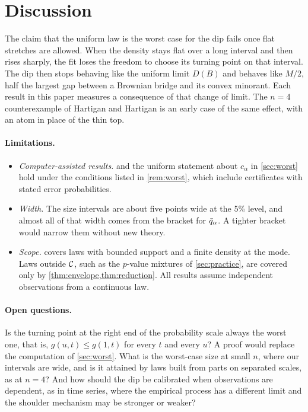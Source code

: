 \section{Discussion}\label{sec:discussion}

The claim that the uniform law is the worst case for the dip fails once flat stretches are allowed. When the density stays flat over a long interval and then rises sharply, the fit loses the freedom to choose its turning point on that interval. The dip then stops behaving like the uniform limit $D(B)$ and behaves like $M/2$, half the largest gap between a Brownian bridge and its convex minorant. Each result in this paper measures a consequence of that change of limit. The $n=4$ counterexample of Hartigan and Hartigan is an early case of the same effect, with an atom in place of the thin top.

\paragraph{Limitations.}
\begin{itemize}[leftmargin=*]
\item \emph{Computer-assisted results.}  and the uniform statement about $c_\alpha$ in \cref{sec:worst} hold under the conditions listed in \cref{rem:worst}, which include certificates with stated error probabilities.
\item \emph{Width.} The size intervals are about five points wide at the 5\% level, and almost all of that width comes from the bracket for $\bar q_\alpha$. A tighter bracket would narrow them without new theory.
\item \emph{Scope.}  covers laws with bounded support and a finite density at the mode. Laws outside $\mathcal{C}$, such as the $p$-value mixtures of \cref{sec:practice}, are covered only by \cref{thm:envelope,thm:reduction}. All results assume independent observations from a continuous law.
\end{itemize}

\paragraph{Open questions.} Is the turning point at the right end of the probability scale always the worst one, that is, $g(u,t)\le g(1,t)$ for every $t$ and every $u$? A proof would replace the computation of \cref{sec:worst}. What is the worst-case size at small $n$, where our intervals are wide, and is it attained by laws built from parts on separated scales, as at $n=4$? And how should the dip be calibrated when observations are dependent, as in time series, where the empirical process has a different limit and the shoulder mechanism may be stronger or weaker?
